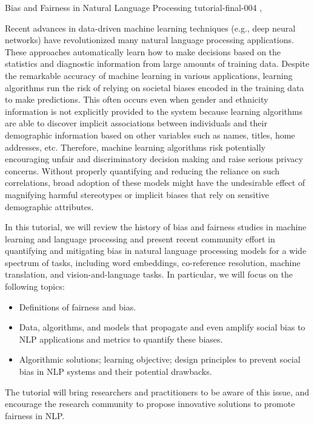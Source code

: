 



\begin{tutorial}
  {Bias and Fairness in Natural Language Processing}
  {tutorial-final-004}
  {\daydateyear, \tutorialmorningtime}
  {\TutLocD}

Recent advances in data-driven machine learning techniques (e.g., deep neural networks) have revolutionized many natural language processing applications. These approaches automatically learn how to make decisions based on the statistics and diagnostic information from large amounts of training data. Despite the remarkable accuracy of machine learning in various applications, learning algorithms run the risk of relying on societal biases encoded in the training data to make predictions. This often occurs even when gender and ethnicity information is not explicitly provided to the system because learning algorithms are able to discover implicit associations between individuals and their demographic information based on other variables such as names, titles, home addresses, etc. Therefore, machine learning algorithms risk potentially encouraging unfair and discriminatory decision making and raise serious privacy concerns. Without properly quantifying and reducing the reliance on such correlations, broad adoption of these models might have the undesirable effect of magnifying harmful stereotypes or implicit biases that rely on sensitive demographic attributes.

In this tutorial, we will review the history of bias and fairness studies in machine learning and language processing and present recent community effort in quantifying and mitigating bias in natural language processing models for a wide spectrum of tasks, including word embeddings, co-reference resolution, machine translation, and vision-and-language tasks. In particular, we will focus on the following topics:

\begin{itemize}
\item Definitions of fairness and bias.

\item Data, algorithms, and models that propagate and even amplify social bias to NLP applications and metrics to quantify these biases.

\item Algorithmic solutions; learning objective; design principles to prevent social bias in NLP systems and their potential drawbacks.
\end{itemize}

The tutorial will bring researchers and practitioners to be aware of this issue, and encourage the research community to propose innovative solutions to promote fairness in NLP.


\end{tutorial}

